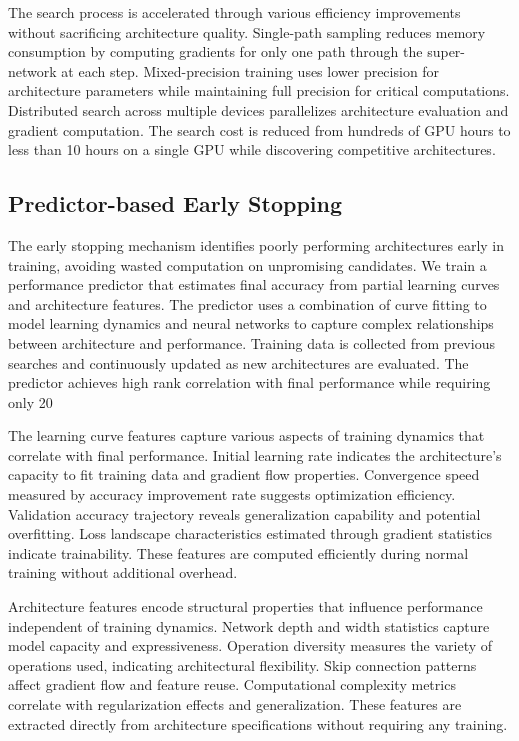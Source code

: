 \documentclass[journal]{IEEEtran}
\begin{document}
The search process is accelerated through various efficiency improvements without sacrificing architecture quality. Single-path sampling reduces memory consumption by computing gradients for only one path through the super-network at each step. Mixed-precision training uses lower precision for architecture parameters while maintaining full precision for critical computations. Distributed search across multiple devices parallelizes architecture evaluation and gradient computation. The search cost is reduced from hundreds of GPU hours to less than 10 hours on a single GPU while discovering competitive architectures.

\subsection{Predictor-based Early Stopping}

The early stopping mechanism identifies poorly performing architectures early in training, avoiding wasted computation on unpromising candidates. We train a performance predictor that estimates final accuracy from partial learning curves and architecture features. The predictor uses a combination of curve fitting to model learning dynamics and neural networks to capture complex relationships between architecture and performance. Training data is collected from previous searches and continuously updated as new architectures are evaluated. The predictor achieves high rank correlation with final performance while requiring only 20%

The learning curve features capture various aspects of training dynamics that correlate with final performance. Initial learning rate indicates the architecture's capacity to fit training data and gradient flow properties. Convergence speed measured by accuracy improvement rate suggests optimization efficiency. Validation accuracy trajectory reveals generalization capability and potential overfitting. Loss landscape characteristics estimated through gradient statistics indicate trainability. These features are computed efficiently during normal training without additional overhead.

Architecture features encode structural properties that influence performance independent of training dynamics. Network depth and width statistics capture model capacity and expressiveness. Operation diversity measures the variety of operations used, indicating architectural flexibility. Skip connection patterns affect gradient flow and feature reuse. Computational complexity metrics correlate with regularization effects and generalization. These features are extracted directly from architecture specifications without requiring any training.
\end{document}
